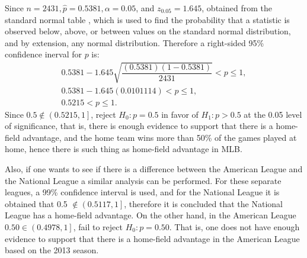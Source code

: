 \documentclass[10pt,leter,openany]{article}
\begin{document}
		Since $n=2431, \hat{p} = 0.5381, \alpha = 0.05$, and $z_{0.05} = 1.645$, obtained from the standard normal table \citep{rohlf1995statistical}, which is used to find the probability that a statistic is observed below, above, or between values on the standard normal distribution, and by extension, any normal distribution. Therefore a right-sided 95\% confidence inerval for $p$ is: \begin{equation*}
			\begin{aligned}
			0.5381 - 1.645 \sqrt{\dfrac{(0.5381)(1-0.5381)}{2431}} < p \leq 1,\\
			0.5381 - 1.645(0.0101114)  < p \leq 1,\\
			0.5215 < p \leq 1.
			\end{aligned}
		\end{equation*}
	Since $ 0.5 \notin \left(0.5215,1\right]$, reject $H_{0}: p = 0.5$ in favor of $H_{1}: p > 0.5$ at the 0.05 level of significance, that is, there is enough evidence to support that there is a home-field advantage, and the home team wins more than 50\% of the games played at home, hence there is such thing as home-field advantage in MLB. 
	
	Also, if one wants to see if there is a difference between the American League and the National League a similar analysis can be performed. For these separate leagues, a 99\% confidence interval is used, and for the National League it is obtained that 0.5 $\notin \left(0.5117,1\right] $, therefore it is concluded that the National League has a home-field advantage. On the other hand, in the American League $0.50 \in \left(0.4978,1\right] $, fail to reject $H_{0}: p = 0.50$. That is, one does not have enough evidence to support that there is a home-field advantage in the American League based on the 2013 season.
			
\clearpage

	
	
	
\end{document}
